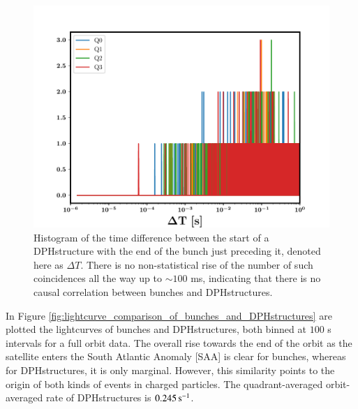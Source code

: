 \begin{figure}
\begin{center}
\includegraphics[scale=0.5]{delta_btn_DPHs_and_previous_bunch}
\caption[Histogram of the time difference between the start of a DPHstructure with the end of the bunch just preceding it]{Histogram of the time difference between the start of a DPHstructure with the end of the bunch just preceding it, denoted here as $\Delta T$. There is no non-statistical rise of the number of such coincidences all the way up to $\sim 100$ ms, indicating that there is no causal correlation between bunches and DPHstructures.}
\label{fig:correlation_between_bunches_and_DPHstructures}
\end{center}
\end{figure}


In  Figure \ref{fig:lightcurve_comparison_of_bunches_and_DPHstructures} are plotted the lightcurves of bunches and DPHstructures, both binned at $100$ s intervals for a full orbit data.  The overall rise towards the end of the orbit as the satellite enters the South Atlantic Anomaly [SAA] is clear for bunches, whereas for DPHstructures, it is only marginal. However, this similarity points to the origin of both kinds of events in charged particles. The quadrant-averaged orbit-averaged rate of DPHstructures is $0.245 \, {\rm s^{-1}}$.

